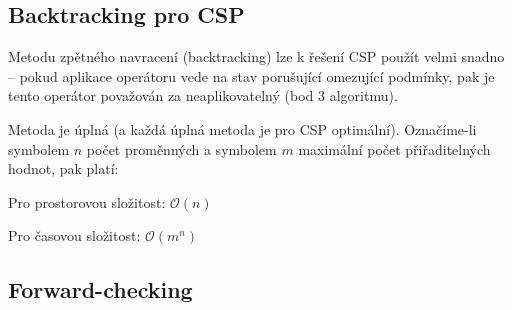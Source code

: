 \subsection{Backtracking pro CSP}

\begin{compactitem}
    \item Metodu zpětného navracení (backtracking) lze k řešení CSP použít velmi snadno -- pokud aplikace operátoru vede na stav porušující omezující podmínky, pak je tento operátor považován za neaplikovatelný (bod 3 algoritmu).

    \item Metoda je úplná (a každá úplná metoda je pro CSP optimální). Označíme-li symbolem $n$ počet proměnných a symbolem $m$ maximální počet přiřaditelných hodnot, pak platí: \begin{compactitem}
        \item Pro prostorovou složitost: $\mathcal{O}(n)$
        \item Pro časovou složitost: $\mathcal{O}(m^n)$
    \end{compactitem}
\end{compactitem}

\subsection{Forward-checking}

